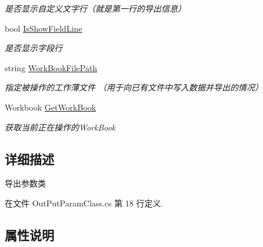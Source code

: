 \begin{DoxyCompactItemize}
\begin{DoxyCompactList}\small\item\em 是否显示自定义文字行（就是第一行的导出信息） \end{DoxyCompactList}\item 
bool \hyperlink{class_x_c_l_net_tools_1_1_entity_1_1_office_1_1_excel_handler_1_1_out_put_param_class_a6003391938fd21744be4f6bb16cf89d9}{Is\+Show\+Field\+Line}
\begin{DoxyCompactList}\small\item\em 是否显示字段行 \end{DoxyCompactList}\item 
string \hyperlink{class_x_c_l_net_tools_1_1_entity_1_1_office_1_1_excel_handler_1_1_out_put_param_class_a5b29724ec341728c000b509ec1a5e5bc}{Work\+Book\+File\+Path}
\begin{DoxyCompactList}\small\item\em 指定被操作的工作薄文件 （用于向已有文件中写入数据并导出的情况） \end{DoxyCompactList}\item 
Workbook \hyperlink{class_x_c_l_net_tools_1_1_entity_1_1_office_1_1_excel_handler_1_1_out_put_param_class_a953f3019c51e0fff8f6ec14dbe3cc10d}{Get\+Work\+Book}
\begin{DoxyCompactList}\small\item\em 获取当前正在操作的\+Work\+Book \end{DoxyCompactList}\end{DoxyCompactItemize}


\subsection{详细描述}
导出参数类 



在文件 Out\+Put\+Param\+Class.\+cs 第 18 行定义.



\subsection{属性说明}
\mbox{\label{class_x_c_l_net_tools_1_1_entity_1_1_office_1_1_excel_handler_1_1_out_put_param_class_a31974296d52728900508e02b4ad040b8}} 
